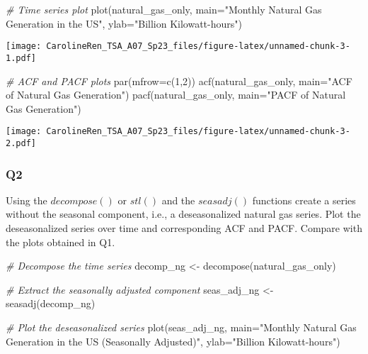 \documentclass[
]{article}
\newenvironment{Shaded}{\begin{snugshade}}{\end{snugshade}}
\newcommand{\AttributeTok}[1]{\textcolor[rgb]{0.77,0.63,0.00}{#1}}
\newcommand{\CommentTok}[1]{\textcolor[rgb]{0.56,0.35,0.01}{\textit{#1}}}
\newcommand{\DecValTok}[1]{\textcolor[rgb]{0.00,0.00,0.81}{#1}}
\newcommand{\FunctionTok}[1]{\textcolor[rgb]{0.00,0.00,0.00}{#1}}
\newcommand{\NormalTok}[1]{#1}
\newcommand{\OtherTok}[1]{\textcolor[rgb]{0.56,0.35,0.01}{#1}}
\newcommand{\StringTok}[1]{\textcolor[rgb]{0.31,0.60,0.02}{#1}}
\begin{document}
\begin{Shaded}
\begin{Highlighting}[]
\CommentTok{\# Time series plot}
\FunctionTok{plot}\NormalTok{(natural\_gas\_only, }\AttributeTok{main=}\StringTok{"Monthly Natural Gas Generation in the US"}\NormalTok{, }\AttributeTok{ylab=}\StringTok{"Billion Kilowatt{-}hours"}\NormalTok{)}
\end{Highlighting}
\end{Shaded}

\texttt{[image: CarolineRen\_TSA\_A07\_Sp23\_files/figure-latex/unnamed-chunk-3-1.pdf]}

\begin{Shaded}
\begin{Highlighting}[]
\CommentTok{\# ACF and PACF plots}
\FunctionTok{par}\NormalTok{(}\AttributeTok{mfrow=}\FunctionTok{c}\NormalTok{(}\DecValTok{1}\NormalTok{,}\DecValTok{2}\NormalTok{))}
\FunctionTok{acf}\NormalTok{(natural\_gas\_only, }\AttributeTok{main=}\StringTok{"ACF of Natural Gas Generation"}\NormalTok{)}
\FunctionTok{pacf}\NormalTok{(natural\_gas\_only, }\AttributeTok{main=}\StringTok{"PACF of Natural Gas Generation"}\NormalTok{)}
\end{Highlighting}
\end{Shaded}

\texttt{[image: CarolineRen\_TSA\_A07\_Sp23\_files/figure-latex/unnamed-chunk-3-2.pdf]}

\hypertarget{q2}{%
\subsubsection{Q2}\label{q2}}

Using the \(decompose()\) or \(stl()\) and the \(seasadj()\) functions
create a series without the seasonal component, i.e., a deseasonalized
natural gas series. Plot the deseasonalized series over time and
corresponding ACF and PACF. Compare with the plots obtained in Q1.

\begin{Shaded}
\begin{Highlighting}[]
\CommentTok{\# Decompose the time series}
\NormalTok{decomp\_ng }\OtherTok{\textless{}{-}} \FunctionTok{decompose}\NormalTok{(natural\_gas\_only)}

\CommentTok{\# Extract the seasonally adjusted component}
\NormalTok{seas\_adj\_ng }\OtherTok{\textless{}{-}} \FunctionTok{seasadj}\NormalTok{(decomp\_ng)}

\CommentTok{\# Plot the deseasonalized series}
\FunctionTok{plot}\NormalTok{(seas\_adj\_ng, }\AttributeTok{main=}\StringTok{"Monthly Natural Gas Generation in the US (Seasonally Adjusted)"}\NormalTok{, }\AttributeTok{ylab=}\StringTok{"Billion Kilowatt{-}hours"}\NormalTok{)}
\end{Highlighting}
\end{Shaded}
\end{document}
